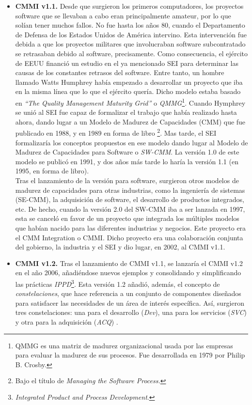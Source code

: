 \begin{itemize}
    \item \textbf{CMMI v1.1.} Desde que surgieron los primeros computadores, los proyectos software que se llevaban a cabo eran principalmente amateur, por lo que solían tener muchos fallos. No fue hasta los años 80, cuando el Departamento de Defensa de los Estados Unidos de América intervino. Esta intervención fue debida a que los proyectos militares que involucraban software subcontratado se retrasaban debido al software, precisamente. Como consecuencia, el ejército de EEUU financió un estudio en el ya mencionado SEI para determinar las causas de los constantes retrasos del software. Entre tanto, un hombre llamado Watts Humphrey había empezado a desarrollar un proyecto que iba en la misma línea que lo que el ejército quería. Dicho modelo estaba basado en \textit{``The Quality Management Maturity Grid''} o \textit{QMMG}\footnote{QMMG es una matriz de madurez organizacional usada por las empresas para evaluar la madurez de sus procesos. Fue desarrollada en 1979 por Philip B. Crosby.}. Cuando Hymphrey se unió al SEI fue capaz de formalizar el trabajo que había realizado hasta ahora, dando lugar a un Modelo de Madurez de Capacidades (CMM) que fue publicado en 1988, y en 1989 en forma de libro \footnote{Bajo el título de \textit{Managing the Software Process.}}. Mas tarde, el SEI formalizaría los conceptos propuestos en ese modelo dando lugar al Modelo de Madurez de Capacidades para Software o \textit{SW-CMM}. La versión 1.0 de este modelo se publicó en 1991, y dos años más tarde lo haría la versión 1.1 (en 1995, en forma de libro).\\
    
    Tras el lanzamiento de la versión para software, surgieron otros modelos de madurez de capacidades para otras industrias, como la ingeniería de sistemas (SE-CMM), la adquisición de software, el desarrollo de productos integrados, etc. De hecho, cuando la versión 2.0 del SW-CMM iba a ser lanzada en 1997, esta se canceló en favor de un proyecto que integrada los múltiples modelos que habían nacido para las diferentes industrias y negocios. Este proyecto era el CMM Integration o CMMI. Dicho proyecto era una colaboración conjunta del gobierno, la industria y el SEI y dio lugar, en 2002, al CMMI v1.1. 
    
    \item \textbf{CMMI v1.2.} Tras el lanzamiento de CMMI v1.1, se lanzaría el CMMI v1.2 en el año 2006, añadiéndose nuevos ejemplos y consolidando y simplificando las prácticas \textit{IPPD}\footnote{\textit{Integrated Product and Process Development}.}. Esta versión 1.2 añadió, además, el concepto de \textit{constelaciones}, que hace referencia a un conjunto de componentes diseñados para satisfacer las necesidades de un área de interés específica. Así, surgieron tres constelaciones: una para el desarrollo (\textit{Dev}), una para los servicios (\textit{SVC}) y otra para la adquisición (\textit{ACQ}) \cite{cmmmiv12}.
    

\end{itemize}
